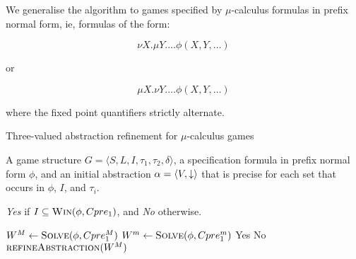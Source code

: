We generalise the algorithm to games specified by $\mu$-calculus formulas in prefix normal form, ie, formulas of the form:

\begin{equation}
\nu X. \mu Y. \ldots \phi(X, Y, \ldots)
\end{equation}

or

\begin{equation}
\mu X. \nu Y. \ldots \phi(X, Y, \ldots)
\end{equation}

\noindent where the fixed point quantifiers strictly alternate.

\begin{algorithm}
\caption{Three-valued abstraction refinement for $\mu$-calculus games}
\label{alg:generic_mu_calc}

\begin{algorithmic}[1]

 A game structure $G = \langle S, L, I, \tau_1, \tau_2, \delta \rangle$, a specification formula in prefix normal form $\phi$, and an initial abstraction $\alpha=\langle V, \mathord{\downarrow} \rangle$ that is precise for each set that occurs in $\phi$, $I$, and $\tau_i$.

 {\it Yes} if $I \subseteq \textsc{Win}(\phi, Cpre_1)$, and {\it No} otherwise.

    \Loop
    \State $W^M \gets \textsc{Solve}(\phi, Cpre_1^M)$ \label{a:tvmc:sM}
    \State $W^m \gets \textsc{Solve}(\phi, Cpre_1^m)$ \label{a:tvmc:sm}
            \State\Return Yes \label{a:tvmc:Y}
            \State\Return No \label{a:tvmc:N}
        \Else       
            \State$\Call{refineAbstraction}{W^M}$
        \EndIf
    \EndLoop
\EndFunction

\end{algorithmic}
\end{algorithm}

